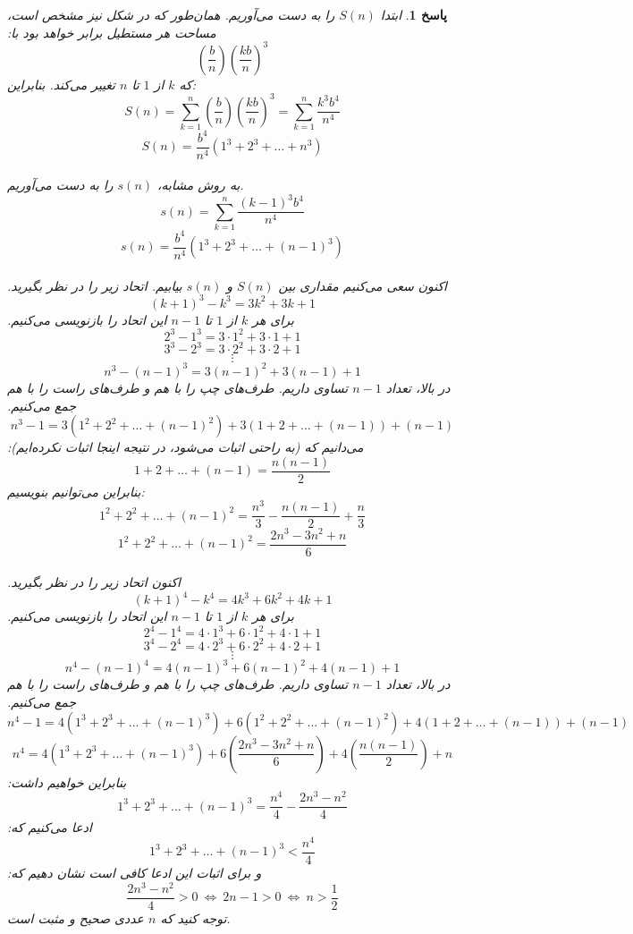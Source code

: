 \documentclass[a4paper,12pt]{article}
\theoremstyle{exercise}
\newtheorem{solution}{پاسخ}
\begin{document}
\begin{solution}
		ابتدا
		$S(n)$
		را به دست می‌آوریم. همان‌طور که در شکل نیز مشخص است، مساحت هر مستطیل برابر خواهد بود با:
		$$\left( \frac{b}{n} \right) \left( \frac{kb}{n} \right)^3$$
		که $k$ از $1$ تا $n$ تغییر می‌کند. بنابراین:
		$$S(n) = \sum_{k=1}^{n} \left( \frac{b}{n} \right) \left( \frac{kb}{n} \right)^3 = \sum_{k=1}^{n} \frac{k^3 b^4}{n^4}$$
		$$S(n)=\frac{b^4}{n^4} \left( 1^3 + 2^3 + \dots + n^3 \right)$$
		\\
		به روش مشابه،
		$s(n)$
		را به دست می‌آوریم.
		$$s(n) = \sum_{k=1}^{n} \frac{(k-1)^3 b^4}{n^4}$$
		$$s(n)=\frac{b^4}{n^4} \left( 1^3 + 2^3 + \dots + (n-1)^3 \right)$$
		\\
		اکنون سعی می‌کنیم مقداری بین
		$S(n)$ و $s(n)$
		بیابیم. اتحاد زیر را در نظر بگیرید.
		$$(k+1)^3 - k^3 = 3k^2 + 3k + 1$$
		برای هر $k$ از $1$ تا
		$n-1$
		این اتحاد را بازنویسی می‌کنیم.
		$$2^3 - 1^3 = 3 \cdot 1^2 + 3 \cdot 1 + 1$$
		$$3^3 - 2^3 = 3 \cdot 2^2 + 3 \cdot 2 + 1$$
		$$\vdots$$
		$$n^3 - (n-1)^3 = 3(n-1)^2 + 3(n-1) + 1$$
		در بالا، تعداد
		$n-1$
		تساوی داریم. طرف‌های چپ را با هم و طرف‌های راست را با هم جمع می‌کنیم.
		$$n^3 - 1 = 3 \left( 1^2 + 2^2 + \dots + (n-1)^2 \right) + 3 \left( 1 + 2 + \dots + (n-1) \right) + (n-1)$$
		می‌دانیم که (به راحتی اثبات می‌شود، در نتیجه اینجا اثبات نکرده‌ایم):
		$$1 + 2 + \dots + (n-1) = \frac{n(n-1)}{2}$$
		بنابراین می‌توانیم بنویسیم:
		$$1^2 + 2^2 + \dots + (n-1)^2 = \frac{n^3}{3} - \frac{n(n-1)}{2} + \frac{n}{3}$$
		$$1^2 + 2^2 + \dots + (n-1)^2 = \frac{2n^3 - 3n^2 + n}{6}$$
		\\
		اکنون اتحاد زیر را در نظر بگیرید.
		$$(k+1)^4 - k^4 = 4k^3 + 6k^2 + 4k + 1$$
		برای هر $k$ از $1$ تا
		$n-1$
		این اتحاد را بازنویسی می‌کنیم.
		$$2^4 - 1^4 = 4 \cdot 1^3 + 6 \cdot 1^2 + 4 \cdot 1 + 1$$
		$$3^4 - 2^4 = 4 \cdot 2^3 + 6 \cdot 2^2 + 4 \cdot 2 + 1$$
		$$\vdots$$
		$$n^4 - (n-1)^4 = 4(n-1)^3 + 6(n-1)^2 + 4(n-1) + 1$$
		در بالا، تعداد
		$n-1$
		تساوی داریم. طرف‌های چپ را با هم و طرف‌های راست را با هم جمع می‌کنیم.
		$$n^4 - 1 = 4 \left( 1^3 + 2^3 + \dots + (n-1)^3 \right) + 6 \left( 1^2 + 2^2 + \dots + (n-1)^2 \right) + 4 \left( 1 + 2 + \dots + (n-1) \right) + (n-1)$$
		$$n^4 = 4 \left( 1^3 + 2^3 + \dots + (n-1)^3 \right) + 6 \left( \frac{2n^3 - 3n^2 + n}{6} \right) + 4 \left( \frac{n(n-1)}{2} \right) + n$$
		بنابراین خواهیم داشت:
		$$1^3 + 2^3 + \dots + (n-1)^3 = \frac{n^4}{4} - \frac{2n^3 - n^2}{4}$$
		ادعا می‌کنیم که:
		$$1^3 + 2^3 + \dots + (n-1)^3 < \frac{n^4}{4}$$
		و برای اثبات این ادعا کافی است نشان دهیم که:
		$$\frac{2n^3 - n^2}{4} > 0 \ \Leftrightarrow \ 2n-1 > 0 \ \Leftrightarrow \ n > \frac{1}{2}$$
		توجه کنید که $n$ عددی صحیح و مثبت است.

\end{solution}
\end{document}
